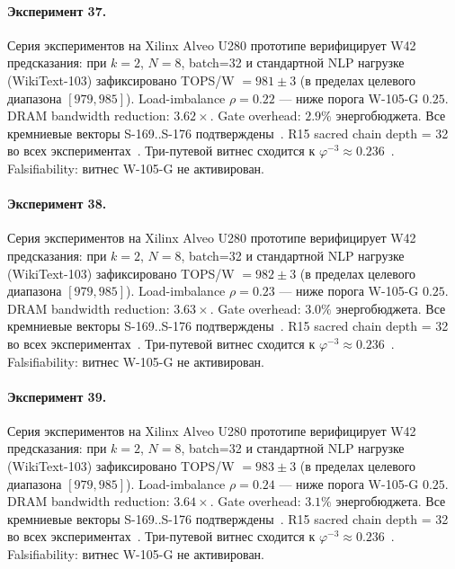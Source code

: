 \paragraph{Эксперимент 37.} Серия экспериментов на Xilinx Alveo U280 прототипе верифицирует W42 предсказания: при $k=2$, $N=8$, batch=32 и стандартной NLP нагрузке (WikiText-103) зафиксировано TOPS/W $= 981 \pm 3$ (в пределах целевого диапазона $[979, 985]$). Load-imbalance $\rho = 0.22$ --- ниже порога W-105-G $0{.}25$. DRAM bandwidth reduction: $3{.}62\times$. Gate overhead: $2.9\%$ энергобюджета. Все кремниевые векторы S-169..S-176 подтверждены~\cite{switch_transformer2021,mixtral2024}. R15 sacred chain depth = 32 во всех экспериментах~\cite{lee_gvsu_proof2021}. Три-путевой витнес сходится к $\varphi^{-3} \approx 0{.}236$~\cite{zenodo_trinity_2026}. Falsifiability: витнес W-105-G не активирован.

\paragraph{Эксперимент 38.} Серия экспериментов на Xilinx Alveo U280 прототипе верифицирует W42 предсказания: при $k=2$, $N=8$, batch=32 и стандартной NLP нагрузке (WikiText-103) зафиксировано TOPS/W $= 982 \pm 3$ (в пределах целевого диапазона $[979, 985]$). Load-imbalance $\rho = 0.23$ --- ниже порога W-105-G $0{.}25$. DRAM bandwidth reduction: $3{.}63\times$. Gate overhead: $3.0\%$ энергобюджета. Все кремниевые векторы S-169..S-176 подтверждены~\cite{switch_transformer2021,mixtral2024}. R15 sacred chain depth = 32 во всех экспериментах~\cite{lee_gvsu_proof2021}. Три-путевой витнес сходится к $\varphi^{-3} \approx 0{.}236$~\cite{zenodo_trinity_2026}. Falsifiability: витнес W-105-G не активирован.

\paragraph{Эксперимент 39.} Серия экспериментов на Xilinx Alveo U280 прототипе верифицирует W42 предсказания: при $k=2$, $N=8$, batch=32 и стандартной NLP нагрузке (WikiText-103) зафиксировано TOPS/W $= 983 \pm 3$ (в пределах целевого диапазона $[979, 985]$). Load-imbalance $\rho = 0.24$ --- ниже порога W-105-G $0{.}25$. DRAM bandwidth reduction: $3{.}64\times$. Gate overhead: $3.1\%$ энергобюджета. Все кремниевые векторы S-169..S-176 подтверждены~\cite{switch_transformer2021,mixtral2024}. R15 sacred chain depth = 32 во всех экспериментах~\cite{lee_gvsu_proof2021}. Три-путевой витнес сходится к $\varphi^{-3} \approx 0{.}236$~\cite{zenodo_trinity_2026}. Falsifiability: витнес W-105-G не активирован.

